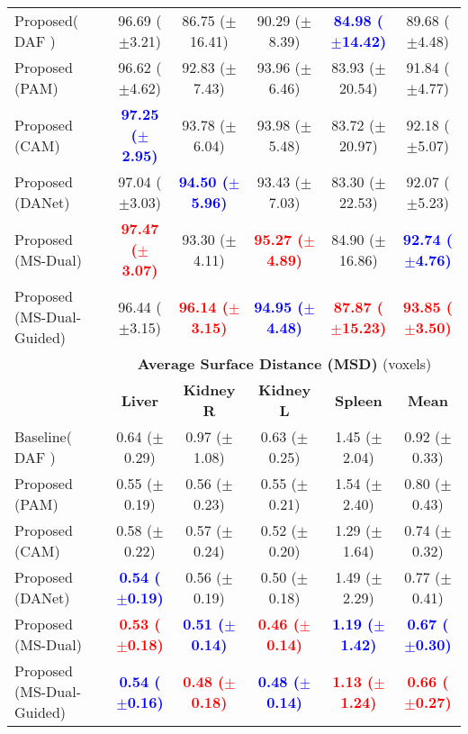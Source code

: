 \documentclass[journal]{IEEEtran}
\begin{document}
\begin{table*}[ht!]
\begin{tabular}{lcccc|c}
\midrule
Proposed( DAF \cite{wang18d})  &  96.69 ($\pm$3.21) & 86.75 ($\pm$16.41) & 90.29 ($\pm$8.39) & \textcolor{blue}{\textbf{84.98 ($\pm$14.42)}} &   89.68 ($\pm$4.48)  \\
Proposed (PAM)     & 96.62 ($\pm$4.62)& 92.83 ($\pm$7.43)& 93.96 ($\pm$6.46)& 83.93 ($\pm$20.54)&  91.84 ($\pm$4.77) \\
Proposed (CAM)     & \textcolor{blue}{\textbf{97.25 ($\pm$2.95)}}  & 93.78 ($\pm$6.04)& 93.98 ($\pm$5.48)& 83.72 ($\pm$20.97)& 92.18 ($\pm$5.07)\\
Proposed (DANet) &  97.04 ($\pm$3.03)& \textcolor{blue}{\textbf{94.50 ($\pm$5.96)}} & 93.43 ($\pm$7.03)& 83.30 ($\pm$22.53)&  92.07 ($\pm$5.23)     \\
Proposed (MS-Dual)  & \textcolor{red}{\textbf{97.47 ($\pm$3.07)}}  & 93.30 ($\pm$4.11)& \textcolor{red}{\textbf{95.27 ($\pm$4.89)}}  & 84.90 ($\pm$16.86) & \textcolor{blue}{\textbf{92.74 ($\pm$4.76)}} \\
Proposed (MS-Dual-Guided)  &  96.44 ($\pm$3.15)  & \textcolor{red}{\textbf{96.14 ($\pm$3.15)}}& \textcolor{blue}{\textbf{94.95 ($\pm$4.48)}}  & \textcolor{red}{\textbf{87.87 ($\pm$15.23)}} & \textcolor{red}{\textbf{93.85 ($\pm$3.50)}} \\

\midrule
& \multicolumn{5}{c}{\textbf{Average Surface Distance (MSD)} (voxels)}\\
 \midrule
 & \textbf{Liver} & \textbf{Kidney R} & \textbf{Kidney L} & \textbf{Spleen} & \textbf{Mean}  \\
 \midrule
Baseline( DAF \cite{wang18d})  & 0.64 ($\pm$0.29) & 0.97 ($\pm$1.08) & 0.63 ($\pm$0.25)& 1.45 ($\pm$2.04)&  0.92 ($\pm$0.33)  \\
Proposed (PAM)     & 0.55 ($\pm$0.19)& 0.56 ($\pm$0.23)& 0.55 ($\pm$0.21)& 1.54 ($\pm$2.40)&  0.80 ($\pm$0.43) \\
Proposed (CAM)     &  0.58 ($\pm$0.22)& 0.57 ($\pm$0.24)& 0.52 ($\pm$0.20)& 1.29 ($\pm$1.64)  & 0.74 ($\pm$0.32)\\
Proposed (DANet) & \textcolor{blue}{\textbf{0.54 ($\pm$0.19)}}  &0.56 ($\pm$0.19) & 0.50 ($\pm$0.18)& 1.49 ($\pm$2.29)&   0.77 ($\pm$0.41) \\
Proposed (MS-Dual)  & \textcolor{red}{\textbf{0.53 ($\pm$0.18)}}  & \textcolor{blue}{\textbf{0.51 ($\pm$0.14)}}&  \textcolor{red}{\textbf{0.46 ($\pm$0.14)}} & \textcolor{blue}{\textbf{1.19 ($\pm$1.42)}} &  \textcolor{blue}{\textbf{0.67 ($\pm$0.30)}}\\
Proposed (MS-Dual-Guided)  & \textcolor{blue}{\textbf{0.54 ($\pm$0.16)}}  & \textcolor{red}{\textbf{0.48 ($\pm$0.18)}}&  \textcolor{blue}{\textbf{0.48 ($\pm$0.14)}} & \textcolor{red}{\textbf{1.13 ($\pm$1.24)}} &  \textcolor{red}{\textbf{0.66 ($\pm$0.27)}}\\
\midrule




\end{tabular}
\end{table*}
\end{document}
